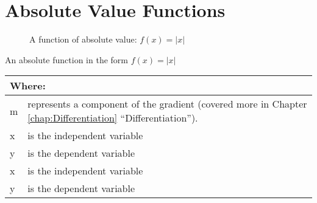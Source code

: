 \section{Absolute Value Functions}
\begin{figure}[!hbt]
\label{fig:FuncGraphAbsolute}
\caption{A function of absolute value: $f(x) = |x|$}
\end{figure}
An absolute function in the form $ f(x) = |x|$
\begin{table}[!hbt]
\label{tab:PartsOfAnAbsoluteFunction}
\begin{tabularx}{\linewidth}{| l X |}
  \hline
  \multicolumn{2}{|l|}{Where:} \\
  \hline \hline
  m & represents a component of the gradient (covered more in Chapter
  \ref{chap:Differentiation} ``Differentiation''). \\
  x & is the independent variable \\
  y & is the dependent variable \\
  x & is the independent variable \\
  y & is the dependent variable \\
\hline
\end{tabularx}
\end{table}
\clearpage